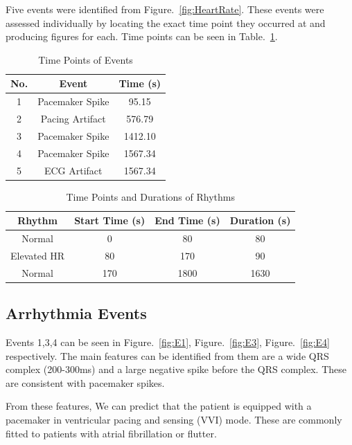 \documentclass[conference]{IEEEtran}
\begin{document}
Five events were identified from Figure.~\ref{fig:HeartRate}. These events were assessed individually by locating the exact time point they occurred at and producing figures for each. Time points can be seen in Table.~\ref{tab:spikes}. 

\begin{table}[h]
\centering
\begin{tabular}{|c|c|c|}
\hline
\textbf{No.} & \textbf{Event} & \textbf{Time (s)} \\
\hline
1 & Pacemaker Spike & 95.15\\
2 & Pacing Artifact & 576.79 \\
3 & Pacemaker Spike & 1412.10\\
4 & Pacemaker Spike & 1567.34 \\
5 & ECG Artifact & 1567.34 \\

\hline
\end{tabular}
\caption{Time Points of Events}
\label{tab:spikes}
\end{table}



\begin{table}[h]
\centering
\begin{tabular}{|c|c|c|c|}
\hline
\textbf{Rhythm} & \textbf{Start Time (s)}  & \textbf{End Time (s)} & \textbf{Duration (s)} \\
\hline
Normal & 0 & 80 & 80\\
Elevated HR & 80 & 170 & 90\\
Normal & 170 & 1800 & 1630\\

\hline
\end{tabular}
\caption{Time Points and Durations of Rhythms}
\label{tab:times}
\end{table}

\subsection{Arrhythmia Events}

Events 1,3,4 can be seen in Figure.~\ref{fig:E1}, Figure.~\ref{fig:E3}, Figure.~\ref{fig:E4} respectively. The main features can be identified from them are a wide QRS complex (200-300ms) and a large negative spike before the QRS complex. These are consistent with pacemaker spikes.

From these features, We can predict that the patient is equipped with a pacemaker in ventricular pacing and sensing (VVI) mode. These are commonly fitted to patients with atrial fibrillation or flutter.
\end{document}
